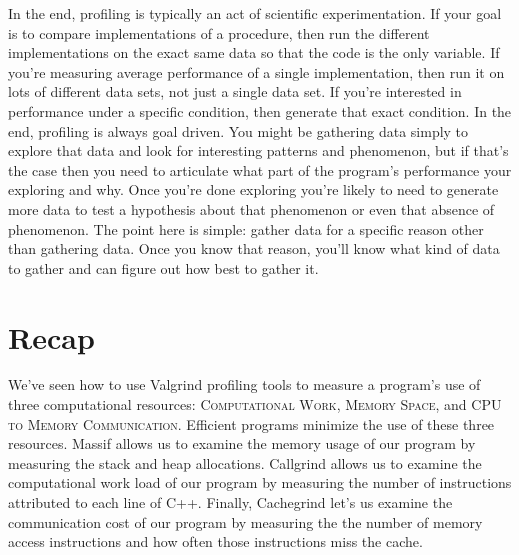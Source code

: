 \documentclass[]{tufte-handout}
\begin{document}
In the end, profiling is typically an act of scientific experimentation.  If your goal is to compare implementations of a procedure, then run the different implementations on the exact same data so that the code is the only variable. If you're measuring average performance of a single implementation, then run it on lots of different data sets, not just a single data set.  If you're interested in performance under a specific condition, then generate that exact condition. In the end, profiling is always goal driven. You might be gathering data simply to explore that data and look for interesting patterns and phenomenon, but if that's the case then you need to articulate what part of the program's performance your exploring and why.  Once you're done exploring you're likely to need to generate more data to test a hypothesis about that phenomenon or even that absence of phenomenon.  The point here is simple: gather data for a specific reason other than gathering data. Once you know that reason, you'll know what kind of data to gather and can figure out how best to gather it.

\section{Recap}

We've seen how to use Valgrind profiling tools to measure a program's use of three computational resources: \textsc{Computational Work}, \textsc{Memory Space}, and \textsc{CPU to Memory Communication}.  Efficient programs minimize the use of these three resources. Massif allows us to examine the memory usage of our program by measuring the stack and heap allocations. Callgrind allows us to examine the computational work load of our program by measuring the number of instructions  attributed to each line of C++. Finally, Cachegrind let's us examine the communication cost of our program by measuring the the number of memory access instructions and how often those instructions miss the cache.  
\end{document}
